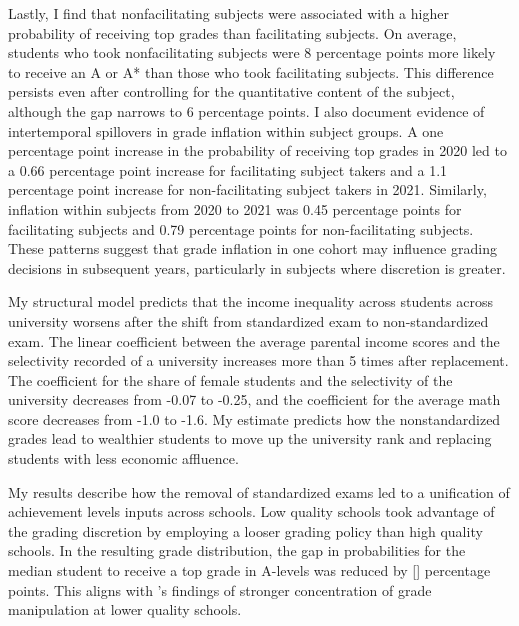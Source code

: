 Lastly, I find that nonfacilitating subjects were associated with a higher probability of receiving top grades than facilitating subjects. On average, students who took nonfacilitating subjects were 8 percentage points more likely to receive an A or A* than those who took facilitating subjects. This difference persists even after controlling for the quantitative content of the subject, although the gap narrows to 6 percentage points. I also document evidence of intertemporal spillovers in grade inflation within subject groups. A one percentage point increase in the probability of receiving top grades in 2020 led to a 0.66 percentage point increase for facilitating subject takers and a 1.1 percentage point increase for non-facilitating subject takers in 2021. Similarly, inflation within subjects from 2020 to 2021 was 0.45 percentage points for facilitating subjects and 0.79 percentage points for non-facilitating subjects. These patterns suggest that grade inflation in one cohort may influence grading decisions in subsequent years, particularly in subjects where discretion is greater.

My structural model predicts that the income inequality across students across university worsens after the shift from standardized exam to non-standardized exam. The linear coefficient between the average parental income scores and the selectivity recorded of a university increases more than 5 times after replacement. The coefficient for the share of female students and the selectivity of the university decreases from -0.07 to -0.25, and the coefficient for the average math score decreases from -1.0 to -1.6. My estimate predicts how the nonstandardized grades lead to wealthier students to move up the university rank and replacing students with less economic affluence. 

My results describe how the removal of standardized exams led to a unification of achievement levels inputs across schools. Low quality schools took advantage of the grading discretion by employing a looser grading policy than high quality schools. In the resulting grade distribution, the gap in probabilities for the median student to receive a top grade in A-levels was reduced by [] percentage points. This aligns with \cite{figlio2004}'s findings of stronger concentration of grade manipulation at lower quality schools. 

